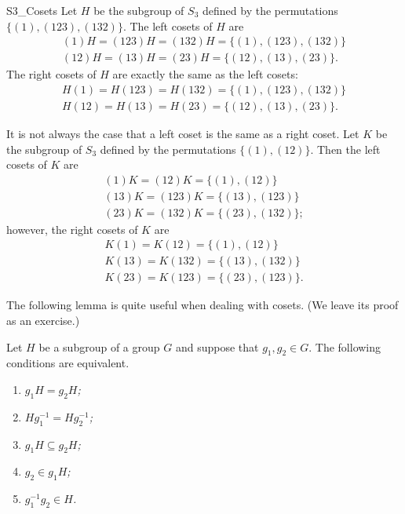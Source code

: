 \begin{example}{S3_Cosets}
Let $H$ be the subgroup of $S_3$ defined by the permutations $\{(1), (123), (132) \}$.  The left cosets of $H$ are 
\begin{gather*}
(1)H = (1 2 3)H =  (132)H = \{(1), (1 23), (132) \} \\
(1 2)H = (1 3)H = (2 3)H =  \{ (1 2), (1 3), (2 3)  \}.
\end{gather*}
The right cosets of $H$ are exactly the same as the left cosets:
\begin{gather*}
H(1) = H(1 2 3) =  H(132) = \{(1), (1 23), (132) \} \\
H(1 2) = H(1 3) = H(2 3) =  \{ (1 2), (1 3), (2 3)  \}.
\end{gather*}

It is not always the case that a left coset is the same as a right coset.  Let $K$ be the subgroup of $S_3$ defined by the permutations $\{(1), (1 2)\}$.  Then the left cosets of $K$ are
\begin{gather*}
(1)K = (1 2)K = \{(1), (1 2)\} \\
(1 3)K = (1 2 3)K = \{(1 3), (1 2 3)\} \\
(2 3)K = (1 3 2)K = \{(2 3), (1 3 2)\};
\end{gather*}
however, the right cosets of $K$ are
\begin{gather*}
K(1) = K(1 2) = \{(1), (1 2)\} \\
K(1 3) = K(1 3 2) = \{(1 3), (1 3 2)\} \\
K(2 3) = K(1 2 3) = \{(2 3), (1 2 3)\}.
\end{gather*}
\end{example}

The following lemma is quite useful when dealing with cosets.  (We leave its proof as an exercise.)

\begin{lemma}\label{cosets_theorem_1}
Let $H$ be a subgroup of a group $G$ and suppose that $g_1, g_2 \in G$.  The following conditions are equivalent.  
\begin{enumerate}
 
\rm \item \it
$g_1 H = g_2 H$; 

\rm \item \it
$H g_1^{-1}  = H g_2^{-1}$; 

\rm \item \it
$g_1 H \subseteq g_2 H$; 

\rm \item \it
$g_2 \in g_1 H$; 

\rm \item \it
$g_1^{-1} g_2 \in H$.
 
\end{enumerate}
\end{lemma}

